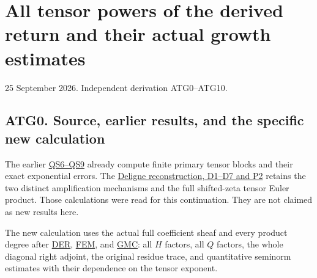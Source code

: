 \section{All tensor powers of the derived return and their actual growth
estimates}\label{all-tensor-powers-of-the-derived-return-and-their-actual-growth-estimates}

25 September 2026. Independent derivation ATG0--ATG10.

\subsection{ATG0. Source, earlier results, and the specific new
calculation}\label{atg0.-source-earlier-results-and-the-specific-new-calculation}

The earlier
\href{https://github.com/KokunoYumeto/zeta-function-research-reader/blob/36a82ecca98addb8a98b48204e349737856c7223/workbenches/splitzero-tandem/continuations/20260924-cohomology-weight-and-character-lifts/original-character-lifting/deligne_quotient_weight_20260924/QUOTIENTS_AND_TENSOR_WEIGHT_ERROR.md}{QS6--QS9}
already compute finite primary tensor blocks and their exact exponential
errors. The
\href{https://github.com/KokunoYumeto/zeta-function-research-reader/blob/36a82ecca98addb8a98b48204e349737856c7223/workbenches/splitzero-tandem/continuations/20260924-cohomology-weight-and-character-lifts/original-character-lifting/deligne_quotient_weight_20260924/DELIGNE_GLOBAL_QUOTIENT_AND_WEIGHT.md}{Deligne
reconstruction, D1--D7 and P2} retains the two distinct amplification
mechanisms and the full shifted-zeta tensor Euler product. Those
calculations were read for this continuation. They are not claimed as
new results here.

The new calculation uses the actual full coefficient sheaf and every
product degree after
\href{https://github.com/KokunoYumeto/zeta-function-research-reader/blob/main/workbenches/splitzero-tandem/continuations/20260925-full-source-tensor-and-original-divisor/counterfactual/DIAGONAL_EXTRAORDINARY_RETURN.md}{DER},
\href{https://github.com/KokunoYumeto/zeta-function-research-reader/blob/main/workbenches/splitzero-tandem/continuations/20260925-full-source-tensor-and-original-divisor/counterfactual/FULL_SOURCE_RETURN_EQUIVARIANCE_AND_MIXED_TENSOR_CLASS.md}{FEM},
and
\href{https://github.com/KokunoYumeto/zeta-function-research-reader/blob/main/workbenches/splitzero-tandem/continuations/20260925-full-source-tensor-and-original-divisor/counterfactual/GLOBAL_MIXED_RETURN_CONTRACTION.md}{GMC}:
all \(H\) factors, all \(Q\) factors, the whole diagonal right adjoint,
the original residue trace, and quantitative seminorm estimates with
their dependence on the tensor exponent.

